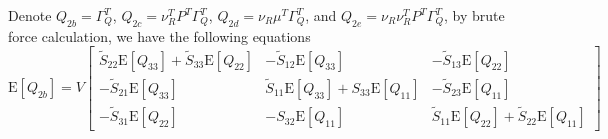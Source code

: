 \documentclass[10pt]{article}
\newcommand{\expect}[1]{\ensuremath{\mathrm{E}\left[ #1 \right]}}
\begin{document}
Denote $Q_{2b} = \Gamma_Q^T$, $Q_{2c} = \nu_R^TP^T\Gamma_Q^T$, $Q_{2d} = \nu_R\mu^T\Gamma_Q^T$, and $Q_{2e} = \nu_R\nu_R^TP^T\Gamma_Q^T$, by brute force calculation, we have the following equations
\begin{equation}
	\expect{Q_{2b}} = V \begin{bmatrix}
		\tilde{S}_{22}\expect{Q_{33}}+\tilde{S}_{33}\expect{Q_{22}} & -\tilde{S}_{12}\expect{Q_{33}} & -\tilde{S}_{13}\expect{Q_{22}} \\
		-\tilde{S}_{21}\expect{Q_{33}} & \tilde{S}_{11}\expect{Q_{33}}+S_{33}\expect{Q_{11}} & -\tilde{S}_{23}\expect{Q_{11}} \\
		-\tilde{S}_{31}\expect{Q_{22}} & -S_{32}\expect{Q_{11}} & \tilde{S}_{11}\expect{Q_{22}}+\tilde{S}_{22}\expect{Q_{11}}
	\end{bmatrix}
\end{equation}
\end{document}
